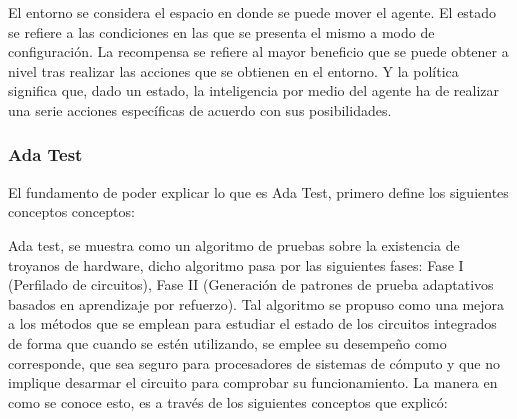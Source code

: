 \begin{itemize}
    El entorno se considera el espacio en donde se puede mover el agente. El
    estado se refiere a las condiciones en las que se presenta el mismo a modo
    de configuración. La recompensa se refiere al mayor beneficio que se puede
    obtener a nivel tras realizar las acciones que se obtienen en el entorno. Y
    la política significa que, dado un estado, la inteligencia por medio del
    agente ha de realizar una serie acciones específicas de acuerdo con sus
    posibilidades. \parencite{Chen2023}
\end{itemize}

\subsubsection{Ada Test}

El fundamento de poder explicar lo que es Ada Test, primero 
define los siguientes conceptos conceptos:


Ada test, \textcite{Chen2023} se muestra como un algoritmo de pruebas sobre la
existencia de troyanos de hardware, dicho algoritmo pasa por las siguientes
fases: Fase I (Perfilado de circuitos), Fase II (Generación de patrones de
prueba adaptativos basados en aprendizaje por refuerzo). Tal algoritmo se
propuso como una mejora a los métodos que se emplean para estudiar el estado de
los circuitos integrados de forma que cuando se estén utilizando, se emplee su
desempeño como corresponde, que sea seguro para procesadores de sistemas de
cómputo y que no implique desarmar el circuito para comprobar su funcionamiento.
La manera en como se conoce esto, es a través de los siguientes conceptos que 
\textcite{Chen2023} explicó:

